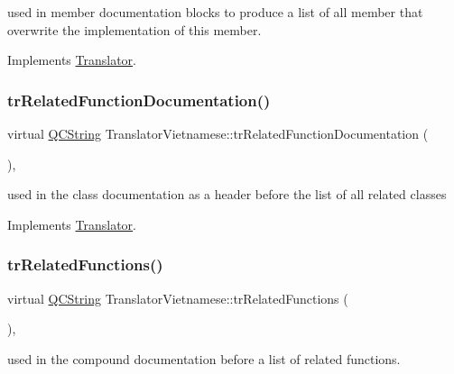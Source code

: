used in member documentation blocks to produce a list of all member that overwrite the implementation of this member. 

Implements \mbox{\hyperlink{class_translator}{Translator}}.

\mbox{\label{class_translator_vietnamese_ab33af1547327903b2c38e29ba32e559d}} 
\subsubsection{\texorpdfstring{trRelatedFunctionDocumentation()}{trRelatedFunctionDocumentation()}}
{\footnotesize\ttfamily virtual \mbox{\hyperlink{class_q_c_string}{Q\+C\+String}} Translator\+Vietnamese\+::tr\+Related\+Function\+Documentation (\begin{DoxyParamCaption}{ }\end{DoxyParamCaption})\hspace{0.3cm}{\ttfamily [inline]}, {\ttfamily [virtual]}}

used in the class documentation as a header before the list of all related classes 

Implements \mbox{\hyperlink{class_translator}{Translator}}.

\mbox{\label{class_translator_vietnamese_a208958837ef8ed02352ce9dc16cce071}} 
\subsubsection{\texorpdfstring{trRelatedFunctions()}{trRelatedFunctions()}}
{\footnotesize\ttfamily virtual \mbox{\hyperlink{class_q_c_string}{Q\+C\+String}} Translator\+Vietnamese\+::tr\+Related\+Functions (\begin{DoxyParamCaption}{ }\end{DoxyParamCaption})\hspace{0.3cm}{\ttfamily [inline]}, {\ttfamily [virtual]}}

used in the compound documentation before a list of related functions. 

